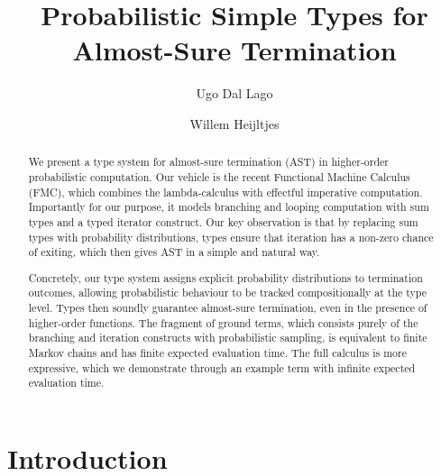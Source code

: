\documentclass[a4paper,UKenglish,cleveref, autoref, thm-restate]{lipics-v2021}
\title{Probabilistic Simple Types for Almost-Sure Termination}
\author{Ugo {Dal Lago}}{University of Bologna, Italy \and INRIA Sophia Antipolis, France}{ugo.dallago@unibo.it}{https://orcid.org/0000-0001-9200-070X}{}
\author{Willem Heijltjes}{University of Bath, United Kingdom \and \url{http://willem.heijltj.es}}{w.b.heijltjes@bath.ac.uk}{https://orcid.org/0009-0001-8941-1150}{}
\begin{document}
\maketitle

\begin{abstract}
We present a type system for almost-sure termination (AST) in higher-order probabilistic computation. Our vehicle is the recent Functional Machine Calculus (FMC), which combines the lambda-calculus with effectful imperative computation. Importantly for our purpose, it models branching and looping computation with sum types and a typed iterator construct. Our key observation is that by replacing sum types with probability distributions, types ensure that iteration has a non-zero chance of exiting, which then gives AST in a simple and natural way. 

Concretely, our type system assigns explicit probability distributions to termination outcomes, allowing probabilistic behaviour to be tracked compositionally at the type level. Types then soundly guarantee almost-sure termination, even in the presence of higher-order functions. The fragment of ground terms, which consists purely of the branching and iteration constructs with probabilistic sampling, is equivalent to finite Markov chains and has finite expected evaluation time. The full calculus is more expressive, which we demonstrate through an example term with infinite expected evaluation time.
\end{abstract}




\section{Introduction}
\end{document}

